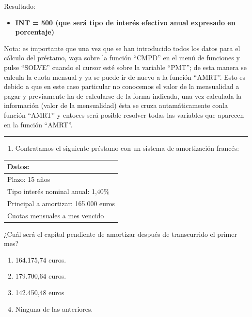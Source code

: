 \documentclass[
  letterpaper,
  DIV=11,
  numbers=noendperiod]{scrreprt}
\providecommand{\tightlist}{%
  \setlength{\itemsep}{0pt}\setlength{\parskip}{0pt}}\usepackage{longtable,booktabs,array}
\begin{document}
\begin{tcolorbox}[enhanced jigsaw, left=2mm, opacityback=0, colback=white, breakable, arc=.35mm, bottomrule=.15mm, rightrule=.15mm, toprule=.15mm, leftrule=.75mm, colframe=quarto-callout-tip-color-frame]
\begin{minipage}[t]{\textwidth - 5.5mm}
Resultado:

\begin{itemize}
\tightlist
\item
  \textbf{INT = 500 (que será tipo de interés efectivo anual expresado
  en porcentaje)}
\end{itemize}

Nota: es importante que una vez que se han introducido todos los datos
para el cálculo del préstamo, vaya sobre la función ``CMPD'' en el menú
de funciones y pulse ``SOLVE'' cuando el cursor esté sobre la variable
``PMT''; de esta manera se calcula la cuota mensual y ya se puede ir de
nuevo a la función ``AMRT''. Esto es debido a que en este caso
particular no conocemos el valor de la mensualidad a pagar y previamente
ha de calcularse de la forma indicada, una vez calculada la información
(valor de la mensualidad) ésta se cruza autamáticamente conla función
``AMRT'' y entoces será posible resolver todas las variables que
aparecen en la función ``AMRT''.

\end{minipage}%
\end{tcolorbox}

\begin{center}\rule{0.5\linewidth}{0.5pt}\end{center}

\begin{enumerate}
\def\labelenumi{\arabic{enumi}.}
\setcounter{enumi}{47}
\tightlist
\item
  Contratamos el siguiente préstamo con un sistema de amortización
  francés:
\end{enumerate}

\begin{longtable}[]{@{}l@{}}
\toprule()
\textbf{Datos:} \\
\midrule()
\endhead
Plazo: 15 años \\
Tipo interés nominal anual: 1,40\% \\
Principal a amortizar: 165.000 euros \\
Cuotas mensuales a mes vencido \\
\bottomrule()
\end{longtable}

¿Cuál será el capital pendiente de amortizar después de transcurrido el
primer mes?

\begin{enumerate}
\def\labelenumi{\alph{enumi})}
\item
  164.175,74 euros.
\item
  179.700,64 euros.
\item
  142.450,48 euros
\item
  Ninguna de las anteriores.
\end{enumerate}
\end{document}

